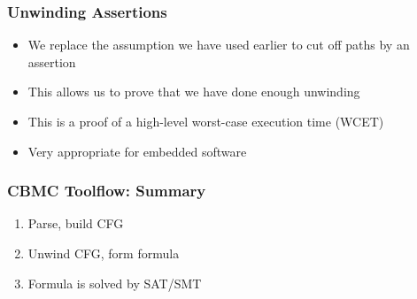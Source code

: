 
\begin{frame}
\frametitle{Unwinding Assertions}

\begin{itemize}
\item We replace the assumption we have used earlier to
cut off paths by an assertion
\vfill

\item[\mycheck] This allows us to
\alert{prove that we have done enough unwinding}
\vfill

\item This is a proof of a high-level worst-case execution time (WCET)
\vfill

\item Very appropriate for embedded software
\end{itemize}

\end{frame}

\begin{frame}
\frametitle{CBMC Toolflow: Summary}

\begin{enumerate}

\item Parse, build CFG
\vfill

\item Unwind CFG, form formula
\vfill

\item Formula is solved by SAT/SMT

\end{enumerate}

\vfill

\begin{center}
\scalebox{.5}{}
\end{center}

\end{frame}


